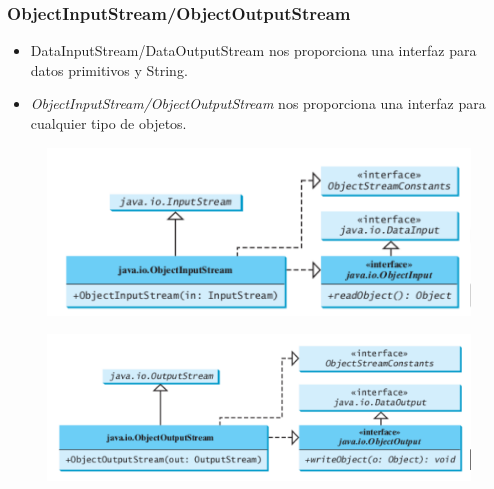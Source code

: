 \documentclass{beamer}
\begin{document}
\begin{frame}[fragile]
\frametitle{ObjectInputStream/ObjectOutputStream}
\begin{itemize}[<+->]
\item DataInputStream/DataOutputStream nos proporciona una interfaz para datos primitivos y String.
\item \emph{ObjectInputStream/ObjectOutputStream} nos proporciona una interfaz para cualquier tipo de objetos.
\end{itemize}
\begin{figure}
\includegraphics[scale=0.5]{imagenes/is.png}
\end{figure}
\begin{figure}
\includegraphics[scale=0.5]{imagenes/os.png}
\end{figure}
\end{frame}
\end{document}
